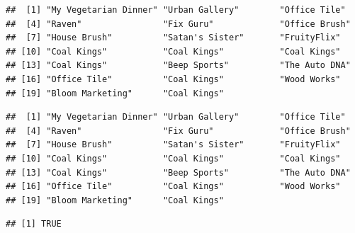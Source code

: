 \documentclass[
]{book}
\newenvironment{Shaded}{\begin{snugshade}}{\end{snugshade}}
\newcommand{\CommentTok}[1]{\textcolor[rgb]{0.56,0.35,0.01}{\textit{#1}}}
\newcommand{\DecValTok}[1]{\textcolor[rgb]{0.00,0.00,0.81}{#1}}
\newcommand{\FloatTok}[1]{\textcolor[rgb]{0.00,0.00,0.81}{#1}}
\newcommand{\FunctionTok}[1]{\textcolor[rgb]{0.13,0.29,0.53}{\textbf{#1}}}
\newcommand{\NormalTok}[1]{#1}
\newcommand{\SpecialCharTok}[1]{\textcolor[rgb]{0.81,0.36,0.00}{\textbf{#1}}}
\begin{document}
\begin{verbatim}
##  [1] "My Vegetarian Dinner" "Urban Gallery"        "Office Tile"         
##  [4] "Raven"                "Fix Guru"             "Office Brush"        
##  [7] "House Brush"          "Satan's Sister"       "FruityFlix"          
## [10] "Coal Kings"           "Coal Kings"           "Coal Kings"          
## [13] "Coal Kings"           "Beep Sports"          "The Auto DNA"        
## [16] "Office Tile"          "Coal Kings"           "Wood Works"          
## [19] "Bloom Marketing"      "Coal Kings"
\end{verbatim}

\begin{Shaded}
\begin{Highlighting}[]
\CommentTok{\# The $ notation is very common and concise. It\textquotesingle{}s equivalent to the [[ notation.}
\NormalTok{data}\FloatTok{.20}\SpecialCharTok{$}\NormalTok{company}
\end{Highlighting}
\end{Shaded}

\begin{verbatim}
##  [1] "My Vegetarian Dinner" "Urban Gallery"        "Office Tile"         
##  [4] "Raven"                "Fix Guru"             "Office Brush"        
##  [7] "House Brush"          "Satan's Sister"       "FruityFlix"          
## [10] "Coal Kings"           "Coal Kings"           "Coal Kings"          
## [13] "Coal Kings"           "Beep Sports"          "The Auto DNA"        
## [16] "Office Tile"          "Coal Kings"           "Wood Works"          
## [19] "Bloom Marketing"      "Coal Kings"
\end{verbatim}

\begin{Shaded}
\end{Shaded}

\begin{verbatim}
## [1] TRUE
\end{verbatim}
\end{document}
